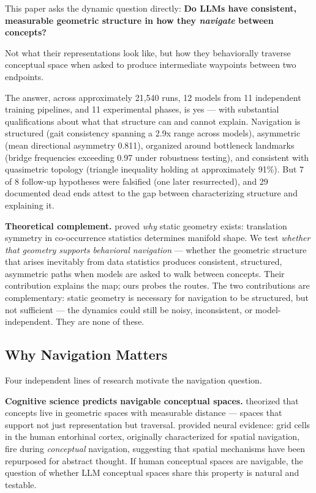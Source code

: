 This paper asks the dynamic question directly: \textbf{Do LLMs have consistent, measurable geometric structure in how they \emph{navigate} between concepts?}

Not what their representations look like, but how they behaviorally traverse conceptual space when asked to produce intermediate waypoints between two endpoints.

The answer, across approximately 21,540 runs, 12 models from 11 independent training pipelines, and 11 experimental phases, is yes --- with substantial qualifications about what that structure can and cannot explain. Navigation is structured (gait consistency spanning a 2.9x range across models), asymmetric (mean directional asymmetry 0.811), organized around bottleneck landmarks (bridge frequencies exceeding 0.97 under robustness testing), and consistent with quasimetric topology (triangle inequality holding at approximately 91\%). But 7 of 8 follow-up hypotheses were falsified (one later resurrected), and 29 documented dead ends attest to the gap between characterizing structure and explaining it.

\textbf{Theoretical complement.} \citet{karkada2025translation} proved \emph{why} static geometry exists: translation symmetry in co-occurrence statistics determines manifold shape. We test \emph{whether that geometry supports behavioral navigation} --- whether the geometric structure that arises inevitably from data statistics produces consistent, structured, asymmetric paths when models are asked to walk between concepts. Their contribution explains the map; ours probes the routes. The two contributions are complementary: static geometry is necessary for navigation to be structured, but not sufficient --- the dynamics could still be noisy, inconsistent, or model-independent. They are none of these.

\subsection{Why Navigation Matters}\label{why-navigation-matters}

Four independent lines of research motivate the navigation question.

\textbf{Cognitive science predicts navigable conceptual spaces.} \citet{gardenfors2000} theorized that concepts live in geometric spaces with measurable distance --- spaces that support not just representation but traversal. \citet{constantinescu2016grid} provided neural evidence: grid cells in the human entorhinal cortex, originally characterized for spatial navigation, fire during \emph{conceptual} navigation, suggesting that spatial mechanisms have been repurposed for abstract thought. If human conceptual spaces are navigable, the question of whether LLM conceptual spaces share this property is natural and testable.

